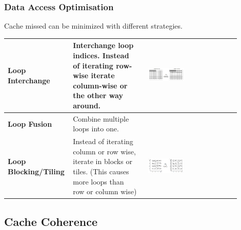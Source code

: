 		\subsubsection{Data Access Optimisation }		
			Cache missed can be minimized with different strategies.			
			\begin{table}[H]
				\centering
				\begin{tabular}{|>{\bfseries}p{0.2\linewidth}|p{0.3\linewidth}|p{0.4\linewidth}|}
					\hline
					Loop Interchange
						& Interchange loop indices. Instead of iterating row-wise iterate column-wise or the other way around.
						& \ \newline \includegraphics[width=0.4\textwidth]{./pictures/loop_interchange.png}\\
					\hline
					Loop Fusion
						& Combine multiple loops into one. 
						& \\
					\hline
					Loop Blocking/Tiling
						& Instead of iterating column or row wise, iterate in blocks or tiles. (This causes more loops than row or column wise) 
						& \ \newline \includegraphics[width=0.4\textwidth]{./pictures/loop_blocking.png}\\
					\hline
				\end{tabular}
			\end{table}
			
	\subsection{Cache Coherence }
